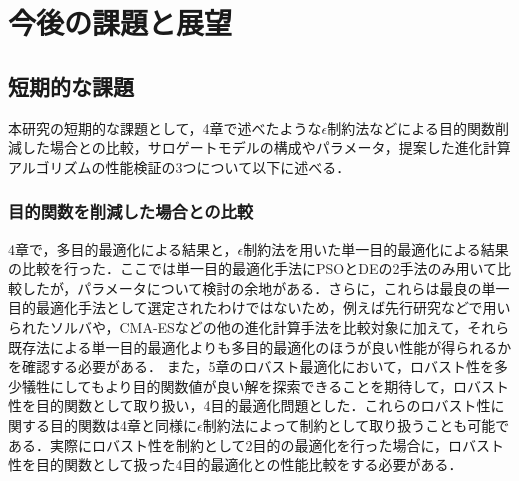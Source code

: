 \section{今後の課題と展望}
\subsection{短期的な課題}
本研究の短期的な課題として，4章で述べたような$\epsilon$制約法などによる目的関数削減した場合との比較，サロゲートモデルの構成やパラメータ，提案した進化計算アルゴリズムの性能検証の3つについて以下に述べる．

\subsubsection{目的関数を削減した場合との比較}
4章で，多目的最適化による結果と，$\epsilon$制約法を用いた単一目的最適化による結果の比較を行った．ここでは単一目的最適化手法にPSOとDEの2手法のみ用いて比較したが，パラメータについて検討の余地がある．さらに，これらは最良の単一目的最適化手法として選定されたわけではないため，例えば先行研究\cite{Alhaider15, Xu13}などで用いられたソルバや，CMA-ESなどの他の進化計算手法を比較対象に加えて，それら既存法による単一目的最適化よりも多目的最適化のほうが良い性能が得られるかを確認する必要がある．
また，5章のロバスト最適化において，ロバスト性を多少犠牲にしてもより目的関数値が良い解を探索できることを期待して，ロバスト性を目的関数として取り扱い，4目的最適化問題とした．これらのロバスト性に関する目的関数は4章と同様に$\epsilon$制約法によって制約として取り扱うことも可能である．実際にロバスト性を制約として2目的の最適化を行った場合に，ロバスト性を目的関数として扱った4目的最適化との性能比較をする必要がある．


